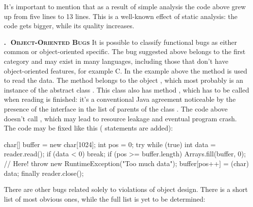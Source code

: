 \documentclass[nosecurity,nobrand]{huawei}
\newcounter{sector}[section]
\renewcommand\thesector{\thesection.\arabic{sector}}
\newcommand{\sector}[1]{\refstepcounter{sector}\vspace{6pt}\textbf{\textsc{\thesector $\;$ #1}}\quad}
\begin{document}
It's important to mention that as a result of simple analysis the code
above grew up from five lines to 13 lines. This is a well-known effect
of static analysis: the code gets bigger, while its quality increases.

\sector{Object-Oriented Bugs}
It is possible to classify functional bugs as either common or object-oriented specific.
The bug suggested above belongs to the first category and may exist in
many languages, including those that don't have object-oriented features,
for example C. In the example above the method  is used to read
the data. The method belongs to the object , which most probably
is an instance of the abstract class . This class
also has method , which has to be called when reading is finished:
it's a conventional Java agreement noticeable by the presence of the
 interface in the list of parents of the class .
The code above doesn't call , which may lead to resource leakage
and eventual program crash. The code may be fixed like this (
statements are added):

\begin{ffcode}[language=Java]
char[] buffer = new char[1024];
int pos = 0;
try {
  while (true) {
    int data = reader.read();
    if (data < 0) {
      break;
    }
    if (pos >= buffer.length) {
      Arrays.fill(buffer, 0); // Here!
      throw new RuntimeException("Too much data");
    }
    buffer[pos++] = (char) data;
  }
} finally {
  reader.close();
}
\end{ffcode}

There are other bugs related solely to violations of object design.
There is a short list of most obvious ones, while the full list is
yet to be determined:
\end{document}
